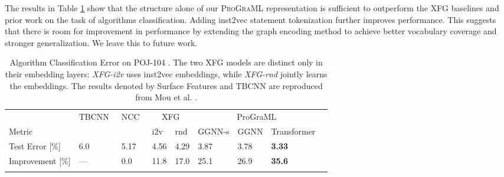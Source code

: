 The results in Table \ref{tab:classify} show that the structure alone
of our \textsc{ProGraML} representation is sufficient to outperform
the XFG baselines and prior work on the task of algorithms
classification. Adding inst2vec statement tokenization further
improves performance. This suggests that there is room for improvement
in performance by extending the graph encoding method to achieve
better vocabulary coverage and stronger generalization. We leave this
to future work.

\begin{table}
  \centering
  \footnotesize
  \begin{tabular}{lllllllll}
    \toprule
        & TBCNN~\cite{Mou2016} & NCC~\cite{Ben-nun2018} & \multicolumn{2}{c}{XFG} & \multicolumn{3}{c}{ProGraML}\\
    \cmidrule(lr){4-5} \cmidrule(lr){6-8}
    Metric & & & i2v & rnd  & GGNN-s & GGNN & Transformer\\
    \midrule
    Test Error [\%] & 6.0 & 5.17 & 4.56 & 4.29 & 3.87 & 3.78 & \textbf{3.33}\\
    Improvement [\%] & --- & 0.0 & 11.8 & 17.0 & 25.1 & 26.9 & \textbf{35.6}\\
    \bottomrule
    \vspace{.7em}
  \end{tabular}
  \caption{%
    Algorithm Classification Error on POJ-104 \cite{Mou2016}. The two
    XFG models are distinct only in their embedding layers:
    \emph{XFG-i2v} uses inst2vec embeddings, while \emph{XFG-rnd}
    jointly learns the embeddings. The results denoted by Surface
    Features and TBCNN are reproduced from Mou et al. \cite{Mou2016}.%
  }
  \label{tab:classify}
\end{table}
